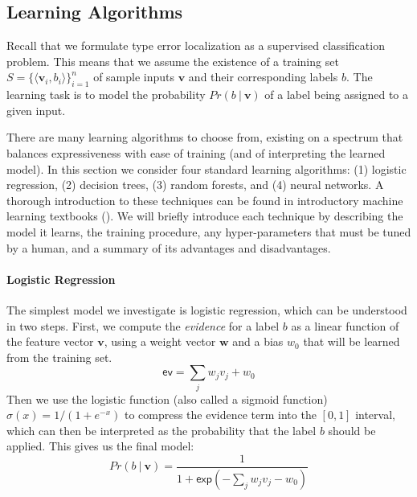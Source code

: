 \subsection{Learning Algorithms}
\label{sec:models}
\lstDeleteShortInline{|} %

Recall that we formulate type error localization as a supervised
classification problem.
%
This means that we assume the existence of a training set
$S = \{\langle \mathbf{v}_i, b_i \rangle\}_{i=1}^{n}$
of sample inputs $\mathbf{v}$ and their corresponding labels $b$.
%
The learning task is to model the probability $Pr(b\ |\ \mathbf{v})$
of a label being assigned to a given input.

There are many learning algorithms to choose from, existing
on a spectrum that balances expressiveness with ease of training (and of
interpreting the learned model).
%
In this section we consider four standard learning algorithms: 
%
(1) logistic regression,
(2) decision trees,
(3) random forests, and
(4) neural networks.
%
A thorough introduction to these techniques can be found in introductory
machine learning textbooks (\eg {}).
%
We will briefly introduce each technique by describing the model it
learns, the training procedure, any hyper-parameters that must be tuned
by a human, and a summary of its advantages and disadvantages.


\paragraph{Logistic Regression}


The simplest model we investigate is logistic regression, which can be
understood in two steps.
%
First, we compute the \emph{evidence} for a label $b$ as a linear
function of the feature vector $\mathbf{v}$, using a weight vector
$\mathbf{w}$ and a bias $w_0$ that will be learned from the training set.
$$
\mathsf{ev} = \sum_j w_j v_j + w_0
$$
Then we use the logistic function (also called a sigmoid function)
$\sigma(x) = 1 / (1 + e^{-x})$ to compress the evidence term into the
$[0,1]$ interval, which can then be interpreted as the probability that
the label $b$ should be applied.
%
This gives us the final model:
$$
Pr(b\ |\ \mathbf{v}) = \frac{1}{1 + \mathsf{exp}(-\sum_j w_j v_j - w_0)}
$$

